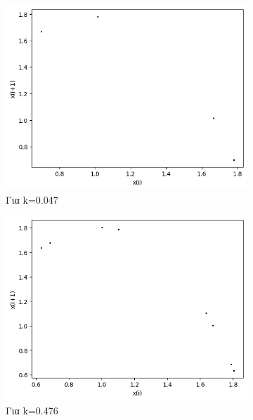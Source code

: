 \begin{figure}[h!]
\begin{subfigure}[b]{0.25\textwidth}
		\includegraphics[width=\textwidth]{LateX images/graphs/k047}
		\caption{Για k=0.047}
		\label{f:k3}
	\end{subfigure}
	\begin{subfigure}[b]{0.25\textwidth}
		\centering
		\includegraphics[width=\textwidth]{LateX images/graphs/k0476}
		\caption{Για k=0.476}
		\label{f:k4}
	\end{subfigure}
	\hfill
	\begin{subfigure}[b]{0.25\textwidth}
		\centering

\end{subfigure}
\end{figure}
